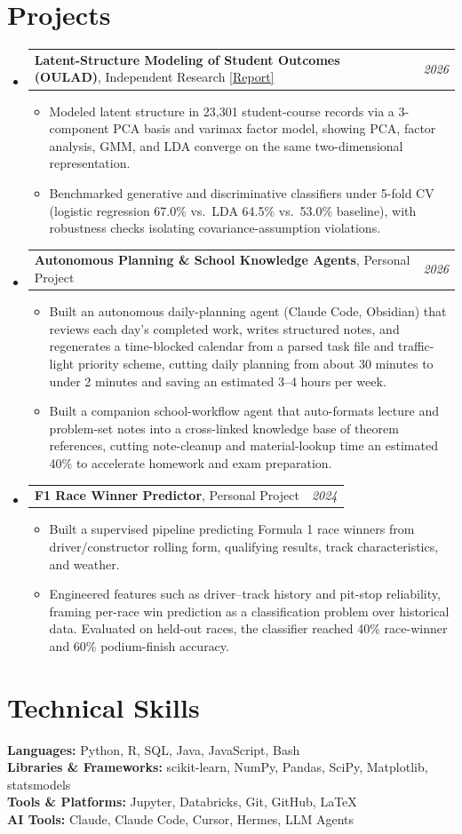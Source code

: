 \documentclass[letterpaper,11pt]{article}
\makeatletter
\newcommand{\resumeItem}[1]{
  \item\small{
    {#1 \vspace{-3pt}}
  }
}
\newcommand{\resumeProjectHeading}[2]{
    \item
    \begin{tabular*}{0.97\textwidth}{l@{\extracolsep{\fill}}r}
      \small#1 & #2 \\
    \end{tabular*}\vspace{-5pt}
}
\newcommand{\resumeSubHeadingListStart}{\begin{itemize}[leftmargin=0.15in, label={}]}
\newcommand{\resumeSubHeadingListEnd}{\end{itemize}}
\newcommand{\resumeItemListStart}{\begin{itemize}}
\newcommand{\resumeItemListEnd}{\end{itemize}\vspace{-7pt}}
\makeatother
\begin{document}
\section{Projects}
  \resumeSubHeadingListStart
    \resumeProjectHeading
      {{\bf Latent-Structure Modeling of Student Outcomes (OULAD)}, Independent Research \href{https://avi-gobrin.github.io/personal-site/assets/oulad-sta437.pdf}{\color{blue}[Report]}}{{\em 2026}}
      \resumeItemListStart
        \resumeItem{Modeled latent structure in 23,301 student-course records via a 3-component PCA basis and varimax factor model, showing PCA, factor analysis, GMM, and LDA converge on the same two-dimensional representation.}
        \resumeItem{Benchmarked generative and discriminative classifiers under 5-fold CV (logistic regression 67.0\% vs.\ LDA 64.5\% vs.\ 53.0\% baseline), with robustness checks isolating covariance-assumption violations.}
      \resumeItemListEnd
    \resumeProjectHeading
      {{\bf Autonomous Planning \& School Knowledge Agents}, Personal Project}{{\em 2026}}
      \resumeItemListStart
        \resumeItem{Built an autonomous daily-planning agent (Claude Code, Obsidian) that reviews each day's completed work, writes structured notes, and regenerates a time-blocked calendar from a parsed task file and traffic-light priority scheme, cutting daily planning from about 30 minutes to under 2 minutes and saving an estimated 3--4 hours per week.}
        \resumeItem{Built a companion school-workflow agent that auto-formats lecture and problem-set notes into a cross-linked knowledge base of theorem references, cutting note-cleanup and material-lookup time an estimated 40\% to accelerate homework and exam preparation.}
      \resumeItemListEnd
    \resumeProjectHeading
      {{\bf F1 Race Winner Predictor}, Personal Project}{{\em 2024}}
      \resumeItemListStart
        \resumeItem{Built a supervised pipeline predicting Formula 1 race winners from driver/constructor rolling form, qualifying results, track characteristics, and weather.}
        \resumeItem{Engineered features such as driver--track history and pit-stop reliability, framing per-race win prediction as a classification problem over historical data. Evaluated on held-out races, the classifier reached 40\% race-winner and 60\% podium-finish accuracy.}
      \resumeItemListEnd
  \resumeSubHeadingListEnd

\section{Technical Skills}
 \begin{itemize}[leftmargin=0.15in, label={}]
    \small{\item{
     \textbf{Languages:} Python, R, SQL, Java, JavaScript, Bash \\
     \textbf{Libraries \& Frameworks:} scikit-learn, NumPy, Pandas, SciPy, Matplotlib, statsmodels \\
     \textbf{Tools \& Platforms:} Jupyter, Databricks, Git, GitHub, \LaTeX \\
     \textbf{AI Tools:} Claude, Claude Code, Cursor, Hermes, LLM Agents
    }}
 \end{itemize}
\end{document}
